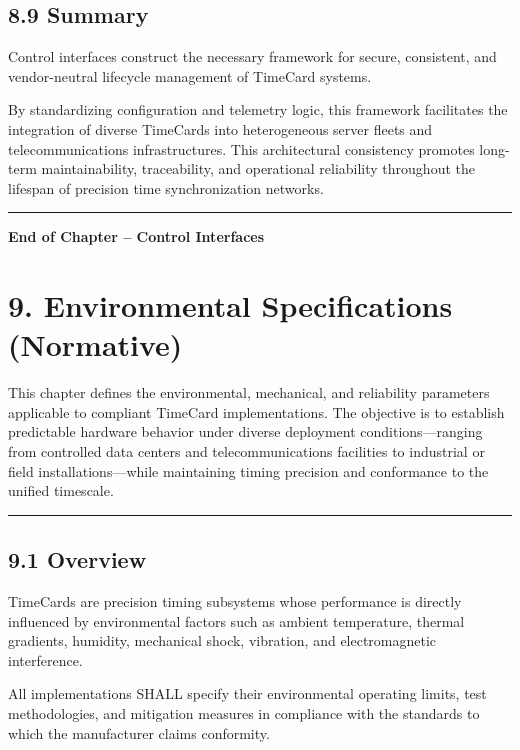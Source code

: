 \documentclass[
]{article}
\begin{document}
\subsection{8.9 Summary}\label{summary-1}

Control interfaces construct the necessary framework for secure,
consistent, and vendor-neutral lifecycle management of TimeCard systems.

By standardizing configuration and telemetry logic, this framework
facilitates the integration of diverse TimeCards into heterogeneous
server fleets and telecommunications infrastructures. This architectural
consistency promotes long-term maintainability, traceability, and
operational reliability throughout the lifespan of precision time
synchronization networks.

\begin{center}\rule{0.5\linewidth}{0.5pt}\end{center}

\textbf{End of Chapter -- Control Interfaces}

\section{9. Environmental Specifications
(Normative)}\label{environmental-specifications-normative}

This chapter defines the environmental, mechanical, and reliability
parameters applicable to compliant TimeCard implementations. The
objective is to establish predictable hardware behavior under diverse
deployment conditions---ranging from controlled data centers and
telecommunications facilities to industrial or field
installations---while maintaining timing precision and conformance to
the unified timescale.

\begin{center}\rule{0.5\linewidth}{0.5pt}\end{center}

\subsection{9.1 Overview}\label{overview-3}

TimeCards are precision timing subsystems whose performance is directly
influenced by environmental factors such as ambient temperature, thermal
gradients, humidity, mechanical shock, vibration, and electromagnetic
interference.

All implementations SHALL specify their environmental operating limits,
test methodologies, and mitigation measures in compliance with the
standards to which the manufacturer claims conformity.
\end{document}
